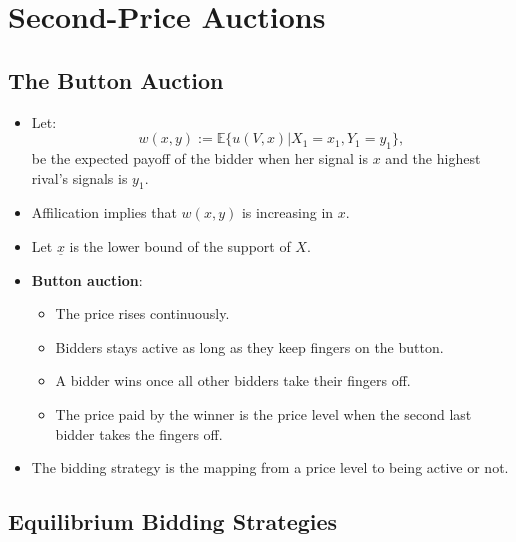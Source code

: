 \documentclass[
]{book}
\providecommand{\tightlist}{%
  \setlength{\itemsep}{0pt}\setlength{\parskip}{0pt}}
\begin{document}
\hypertarget{second-price-auctions}{%
\section{Second-Price Auctions}\label{second-price-auctions}}

\hypertarget{the-button-auction}{%
\subsection{The Button Auction}\label{the-button-auction}}

\begin{itemize}
\tightlist
\item
  Let:
  \[
  w(x, y) := \mathbb{E}\{u(V, x)|X_1 = x_1, Y_1 = y_1\},
  \]
  be the expected payoff of the bidder when her signal is \(x\) and the highest rival's signals is \(y_1\).
\item
  Affilication implies that \(w(x, y)\) is increasing in \(x\).
\item
  Let \(\underline{x}\) is the lower bound of the support of \(X\).
\item
  \textbf{Button auction}:

  \begin{itemize}
  \tightlist
  \item
    The price rises continuously.
  \item
    Bidders stays active as long as they keep fingers on the button.
  \item
    A bidder wins once all other bidders take their fingers off.
  \item
    The price paid by the winner is the price level when the second last bidder takes the fingers off.
  \end{itemize}
\item
  The bidding strategy is the mapping from a price level to being active or not.
\end{itemize}

\hypertarget{equilibrium-bidding-strategies}{%
\subsection{Equilibrium Bidding Strategies}\label{equilibrium-bidding-strategies}}
\end{document}
